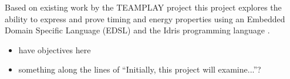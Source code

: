 Based on existing work by the TEAMPLAY project \cite{teamplay:d1.1} this project explores the ability to express and prove timing and energy properties using an Embedded Domain Specific Language (EDSL) and the Idris programming language \cite{brady_2013}.

\begin{itemize}
	\item have objectives here
	\item something along the lines of ``Initially, this project will examine...''?
\end{itemize}